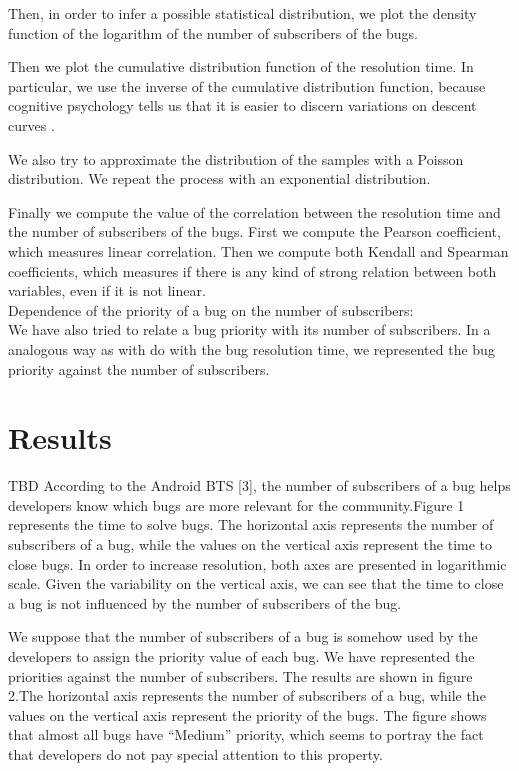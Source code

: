 \documentclass[10pt, conference, compsocconf]{IEEEtran}
\begin{document}
Then, in order to infer a possible statistical distribution, we plot the density function of the logarithm of the number of subscribers of the bugs. 

Then we plot the cumulative distribution function of the resolution time. In particular, we use the inverse of the cumulative distribution function, because cognitive psychology tells us that it is easier to discern variations on descent curves  \cite{NowYouSeeIt}.

We also try to approximate the distribution of the samples with a Poisson distribution. We repeat the process with an exponential distribution.

Finally we compute the value of the correlation between the resolution time and the number of subscribers of the bugs. First we compute the Pearson coefficient, which measures linear correlation. Then we compute both Kendall and Spearman coefficients, which measures if there is any kind of strong relation between both variables, even if it is not linear.
\\
Dependence of the priority of a bug on the number of subscribers:
\\
We have also tried to relate a bug priority with its number of subscribers. In a analogous way as with do with the bug resolution time, we represented the bug priority against  the number of subscribers.

\section{Results}
TBD
According to the Android BTS [3], the number of subscribers of a bug helps developers know which bugs are more relevant for the community.Figure 1 represents the time to solve bugs. The horizontal axis represents the number of subscribers of a bug, while the values on the vertical axis represent the time to close bugs. In order to increase resolution, both axes are presented in logarithmic scale. Given the variability on the vertical axis, we can see that the time to close a bug is not influenced by the number of subscribers of the bug.

We suppose that the number of  subscribers of a bug is somehow used by the developers to assign the priority value of each bug. We have represented the priorities against the number of subscribers. The results are shown in figure 2.The horizontal axis represents the number of subscribers of a bug, while the values on the vertical axis represent the priority of the bugs. The figure shows that almost all bugs have “Medium” priority, which seems to portray the fact that developers do not pay special attention to this property.
\end{document}
